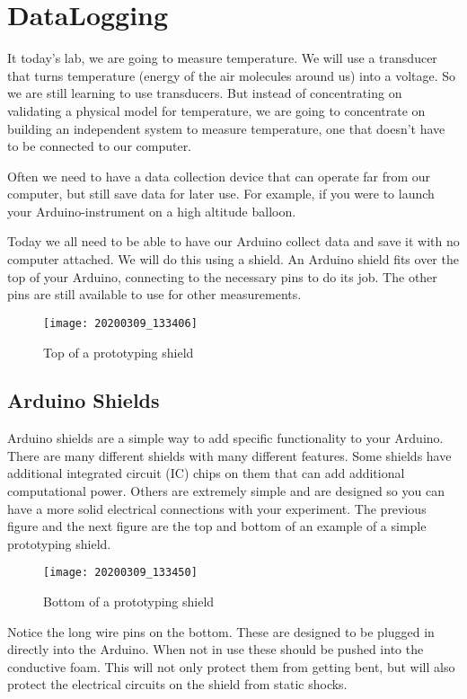 \chapter{DataLogging}
It today's lab, we are going to measure temperature. We will use a transducer that turns temperature (energy of the air molecules around us) into a voltage. So we are still learning to use transducers. But instead of concentrating on validating a physical model for temperature, we are going to concentrate on building an independent system to measure temperature, one that doesn't have to be connected to our computer.

Often we need to have a data collection device that can operate far from our computer, but still save data for later use. For example, if you were to launch your Arduino-instrument on a high altitude balloon.

Today we all need to be able to have our Arduino collect data and save it with no computer attached. We will do this using a shield. An Arduino shield fits over the top of your Arduino, connecting to the necessary pins to do its job. The other pins are still available to use for other measurements. 

	\begin{figure}[h!] 
	\centering
	\caption{Top of a prototyping shield}
	\texttt{[image: 20200309\_133406]}
\end{figure}
\section{Arduino Shields}
	Arduino shields are a simple way to add specific functionality to your Arduino. There are many different shields with many different features. Some shields have additional integrated circuit (IC) chips on them that can add additional computational power.  Others are extremely simple and are designed so you can have a more solid electrical connections with your experiment.  The previous figure and the next figure are the top and bottom of an example of a simple prototyping shield.

	\begin{figure}[h!] 
		\centering
		\caption{Bottom of a prototyping shield}
		\texttt{[image: 20200309\_133450]}
	\end{figure}
	
	Notice the long wire pins on the bottom. These are designed to be plugged in directly into the Arduino. When not in use these should be pushed into the conductive foam. This will not only protect them from getting bent, but will also protect the electrical circuits on the shield from static shocks.
	
